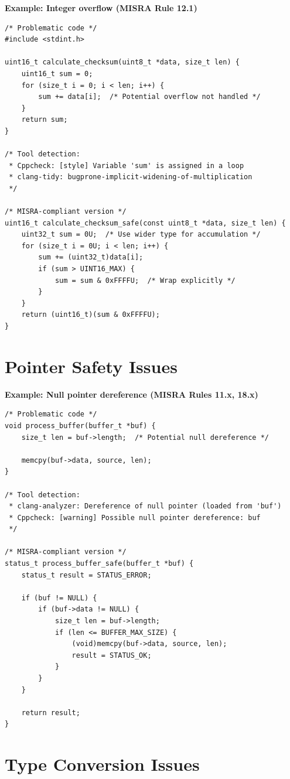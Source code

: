 \documentclass[11pt,letterpaper]{report}
\begin{document}
\textbf{Example: Integer overflow (MISRA Rule 12.1)}

\begin{lstlisting}[style=cstyle]
/* Problematic code */
#include <stdint.h>

uint16_t calculate_checksum(uint8_t *data, size_t len) {
    uint16_t sum = 0;
    for (size_t i = 0; i < len; i++) {
        sum += data[i];  /* Potential overflow not handled */
    }
    return sum;
}

/* Tool detection:
 * Cppcheck: [style] Variable 'sum' is assigned in a loop
 * clang-tidy: bugprone-implicit-widening-of-multiplication
 */

/* MISRA-compliant version */
uint16_t calculate_checksum_safe(const uint8_t *data, size_t len) {
    uint32_t sum = 0U;  /* Use wider type for accumulation */
    for (size_t i = 0U; i < len; i++) {
        sum += (uint32_t)data[i];
        if (sum > UINT16_MAX) {
            sum = sum & 0xFFFFU;  /* Wrap explicitly */
        }
    }
    return (uint16_t)(sum & 0xFFFFU);
}
\end{lstlisting}

\section{Pointer Safety Issues}

\textbf{Example: Null pointer dereference (MISRA Rules 11.x, 18.x)}

\begin{lstlisting}[style=cstyle]
/* Problematic code */
void process_buffer(buffer_t *buf) {
    size_t len = buf->length;  /* Potential null dereference */

    memcpy(buf->data, source, len);
}

/* Tool detection:
 * clang-analyzer: Dereference of null pointer (loaded from 'buf')
 * Cppcheck: [warning] Possible null pointer dereference: buf
 */

/* MISRA-compliant version */
status_t process_buffer_safe(buffer_t *buf) {
    status_t result = STATUS_ERROR;

    if (buf != NULL) {
        if (buf->data != NULL) {
            size_t len = buf->length;
            if (len <= BUFFER_MAX_SIZE) {
                (void)memcpy(buf->data, source, len);
                result = STATUS_OK;
            }
        }
    }

    return result;
}
\end{lstlisting}

\section{Type Conversion Issues}
\end{document}
